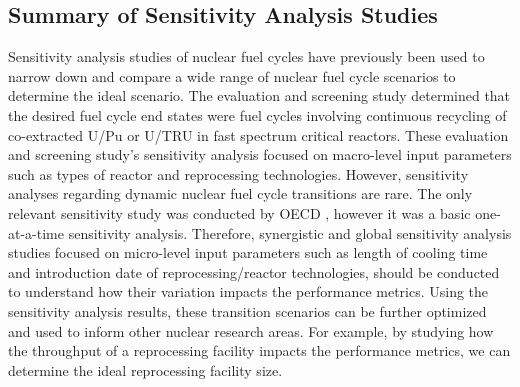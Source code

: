 \subsection{Summary of Sensitivity Analysis Studies}
Sensitivity analysis studies of nuclear fuel cycles have previously been used to narrow 
down and compare a wide range of nuclear fuel cycle scenarios to determine 
the ideal scenario. 
The evaluation and screening study \cite{wigeland_nuclear_2014} determined that the desired 
fuel cycle end states were fuel cycles
involving continuous recycling of co-extracted U/Pu or U/TRU in 
fast spectrum critical reactors.
These evaluation and screening study's sensitivity analysis focused on macro-level input 
parameters such as types of reactor and reprocessing technologies.
However, sensitivity analyses regarding dynamic nuclear fuel cycle transitions are rare. 
The only relevant sensitivity study was conducted by OECD 
\cite{noauthor_effects_2017}, however it was a basic one-at-a-time 
sensitivity analysis.   
Therefore, synergistic and global sensitivity analysis studies focused on
micro-level input parameters such as length of cooling time and  
introduction date of reprocessing/reactor 
technologies, should be conducted to 
understand how their variation impacts the performance metrics. 
Using the sensitivity analysis results, these transition scenarios can be 
further optimized and used to inform other nuclear research areas. 
For example, by studying how the throughput of a reprocessing facility impacts the 
performance metrics, we can determine the ideal reprocessing facility size. 